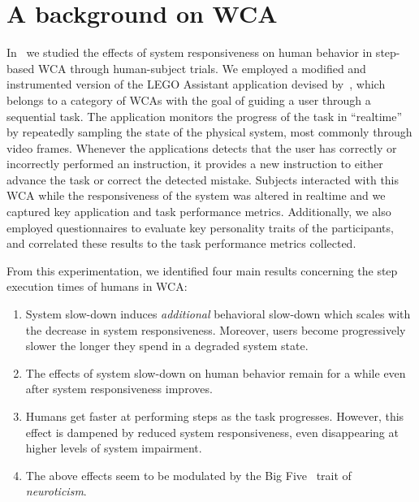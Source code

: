 \section{A background on \ac{WCA}}\label{sec:background}

In~\cite{olguinmunoz:impact2021} we studied the effects of system responsiveness on human behavior in step-based \ac{WCA} through human-subject trials.
We employed a modified and instrumented version of the LEGO Assistant application devised by~\textcite{Chen2015LEGO}, which belongs to a category of \acp{WCA} with the goal of guiding a user through a sequential task.
The application monitors the progress of the task in ``realtime'' by repeatedly sampling the state of the physical system, most commonly through video frames.
Whenever the applications detects that the user has correctly or incorrectly performed an instruction, it provides a new instruction to either advance the task or correct the detected mistake.
Subjects interacted with this \ac{WCA} while the responsiveness of the system was altered in realtime and we captured key application and task performance metrics.
Additionally, we also employed questionnaires to evaluate key personality traits of the participants, and correlated these results to the task performance metrics collected.

From this experimentation, we identified four main results concerning the step execution times of humans in \ac{WCA}:

\begin{enumerate}
    \item System slow-down induces \emph{additional} behavioral slow-down which scales with the decrease in system responsiveness.
    Moreover, users become progressively slower the longer they spend in a degraded system state.

    \item The effects of system slow-down on human behavior remain for a while even after system responsiveness improves.
    
    \item Humans get faster at performing steps as the task progresses. However, this effect is dampened by reduced system responsiveness, even disappearing at higher levels of system impairment.
    
    \item The above effects seem to be modulated by the Big Five~\cite{oliver:bfi1999} trait of \emph{neuroticism}.
\end{enumerate}

